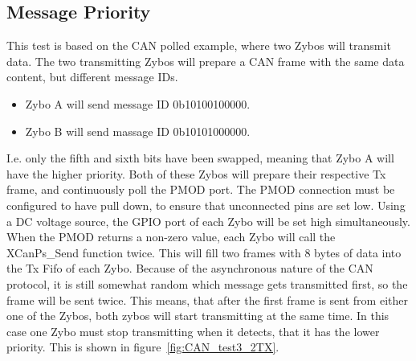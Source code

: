 \subsection{Message Priority}\label{sub:CAN_message priority}
This test is based on the CAN polled example, where two Zybos will transmit data.
The two transmitting Zybos will prepare a CAN frame with the same data content, but different message IDs.
\begin{itemize}
	\item Zybo A will send message ID 0b10100100000.
	\item Zybo B will send massage ID 0b10101000000.
\end{itemize}
I.e. only the fifth and sixth bits have been swapped, meaning that Zybo A will have the higher priority.
Both of these Zybos will prepare their respective Tx frame, and continuously poll the PMOD port.
The PMOD connection must be configured to have pull down, to ensure that unconnected pins are set low.
Using a DC voltage source, the GPIO port of each Zybo will be set high simultaneously.\\

When the PMOD returns a non-zero value, each Zybo will call the XCanPs\_Send function twice.
This will fill two frames with 8 bytes of data into the Tx Fifo of each Zybo. 
Because of the asynchronous nature of the CAN protocol, it is still somewhat random which message gets transmitted first, so the frame will be sent twice. 
This means, that after the first frame is sent from either one of the Zybos, both zybos will start transmitting at the same time. 
In this case one Zybo must stop transmitting when it detects, that it has the lower priority.
This is shown in figure~\ref{fig:CAN_test3_2TX}.\\

